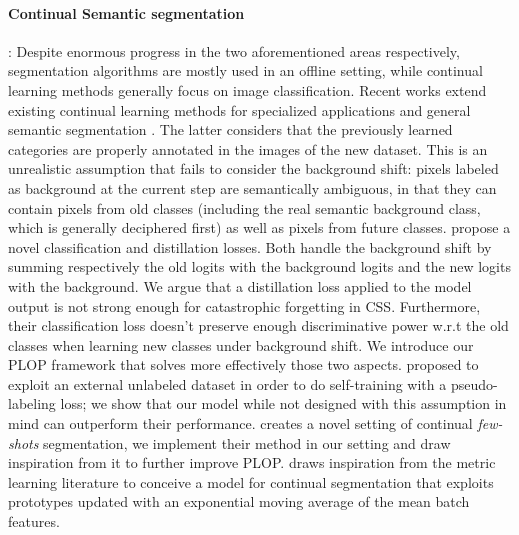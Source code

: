 \paragraph{Continual Semantic segmentation}: Despite enormous progress in the two
aforementioned areas respectively, segmentation algorithms are mostly used in an offline setting,
while continual learning methods generally focus on image classification. Recent works extend
existing continual learning methods \citep{li2018lwf,hou2019ucir} for specialized applications
\citep{ozdemir2018learnthenewkeeptheold,ozdemir2019segmentationanotomical,tasar19incrementsegmentationremotesensing}
and general semantic segmentation \citep{michieli2019ilt}. The latter considers that the previously
learned categories are properly annotated in the images of the new dataset. This is an unrealistic
assumption that fails to consider the background shift: pixels labeled as background at the current
step are semantically ambiguous, in that they can contain pixels from old classes (including the
real semantic background class, which is generally deciphered first) as well as pixels from future
classes. \cite{cermelli2020modelingthebackground} propose a novel classification and
distillation losses. Both handle the background shift by summing respectively the old logits with
the background logits and the new logits with the background. We argue that a distillation loss
applied to the model output is not strong enough for catastrophic forgetting in \ac{CSS}. Furthermore,
their classification loss doesn't preserve enough discriminative power w.r.t the old classes when
learning new classes under background shift. We introduce our PLOP framework that solves more
effectively those two aspects. \cite{yu2020continualsegmentationselftraining} proposed to
exploit an external unlabeled dataset in order to do self-training with a pseudo-labeling loss; we
show that our model while not designed with this assumption in mind can outperform their
performance. \cite{cermelli2020fewshotcontinualsegm} creates a novel setting of
continual \textit{few-shots} segmentation, we implement their method in our setting and draw
inspiration from it to further improve PLOP. \cite{michieli2021sdr} draws
inspiration from the metric learning literature to conceive a model for continual segmentation that
exploits prototypes updated with an exponential moving average of the mean batch features.

